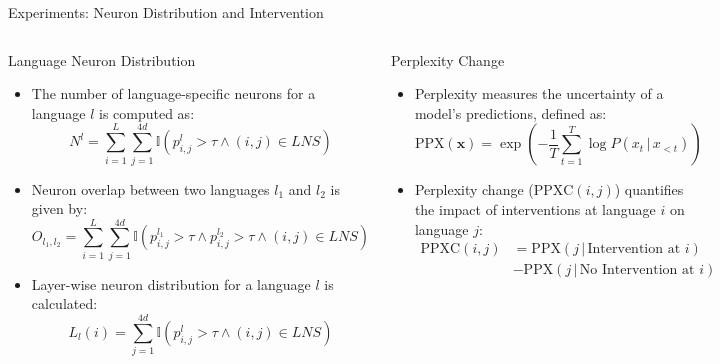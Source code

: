 \documentclass[aspectratio=169]{beamer}
\begin{document}
\begin{frame}{Experiments: Neuron Distribution and Intervention}
	\begin{columns}
		\begin{block}{\scriptsize Language Neuron Distribution}\scriptsize
			\begin{itemize}
				\item The number of language-specific neurons for a language $l$ is computed as:
				\begin{equation}
					N^l = \sum_{i=1}^{L} \sum_{j=1}^{4d} \mathbb{I}\left(p_{i,j}^l > \tau \land (i,j) \in LNS \right)
				\end{equation}
				\item Neuron overlap between two languages $l_1$ and $l_2$ is given by:
				\begin{equation}
					O_{l_1, l_2} = \sum_{i=1}^{L} \sum_{j=1}^{4d} \mathbb{I}\left(p_{i,j}^{l_1} > \tau \land p_{i,j}^{l_2} > \tau \land (i,j) \in LNS \right)
				\end{equation}
				\item Layer-wise neuron distribution for a language $l$ is calculated:
				\begin{equation}
					L_l(i) = \sum_{j=1}^{4d} \mathbb{I}\left(p_{i,j}^l > \tau \land (i,j) \in LNS \right)
				\end{equation}
			\end{itemize}		  
		\end{block}
		\begin{block}{\scriptsize Perplexity Change}\scriptsize
			\begin{itemize}
				\item Perplexity measures the uncertainty of a model's predictions, defined as:
				\begin{equation}
					\text{PPX}(\mathbf{x}) = \exp\left(-\frac{1}{T} \sum_{t=1}^T \log P(x_t \,|\, x_{<t})\right)
				\end{equation}
				\item Perplexity change ($\text{PPXC}(i,j)$) quantifies the impact of interventions at language $i$ on language $j$:
				\begin{equation}
				\begin{aligned}
					\text{PPXC}(i,j) &= \text{PPX}(j \,|\, \text{Intervention at } i) \\
					&- \text{PPX}(j \,|\, \text{No Intervention at } i)
				\end{aligned}
			\end{equation}
			\end{itemize}
		\end{block}
	\end{columns}
\end{frame}
\end{document}
